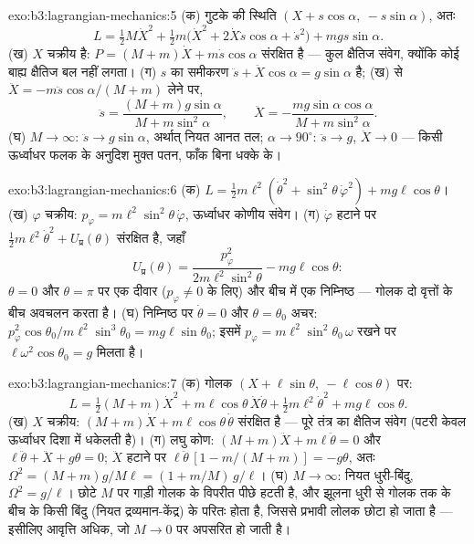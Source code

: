 \begin{solution}{exo:b3:lagrangian-mechanics:5}
(क) गुटके की स्थिति $(X + s\cos\alpha,\ -s\sin\alpha)$, अतः
\[
L = \tfrac12 M\dot X^2 + \tfrac12 m\big(\dot X^2 +
2\dot X\dot s\cos\alpha + \dot s^2\big) + mgs\sin\alpha .
\]
(ख) $X$ चक्रीय है: $P = (M + m)\dot X + m\dot s\cos\alpha$ संरक्षित है
--- कुल क्षैतिज संवेग, क्योंकि कोई बाह्य क्षैतिज बल नहीं लगता।
(ग) $s$ का समीकरण $\ddot s + \ddot
X\cos\alpha = g\sin\alpha$ है; (ख) से $\ddot X = -m\ddot s\cos\alpha/(M +
m)$ लेने पर,
\[
\ddot s = \frac{(M + m)g\sin\alpha}{M + m\sin^2\alpha} , \qquad
\ddot X = -\frac{mg\sin\alpha\cos\alpha}{M + m\sin^2\alpha} .
\]
(घ) $M \to \infty$: $\ddot s \to g\sin\alpha$, अर्थात् नियत आनत तल;
$\alpha \to 90^\circ$: $\ddot s \to g$, $\ddot X \to 0$ --- किसी
ऊर्ध्वाधर फलक के अनुदिश मुक्त पतन, फाँक बिना धक्के के।
\end{solution}

\begin{solution}{exo:b3:lagrangian-mechanics:6}
(क) $L = \tfrac12 m\ell^2(\dot\theta^2 + \sin^2\theta\,\dot\varphi^2) +
mg\ell\cos\theta$। (ख) $\varphi$ चक्रीय: $p_\varphi =
m\ell^2\sin^2\theta\,\dot\varphi$, ऊर्ध्वाधर कोणीय संवेग। (ग)
$\dot\varphi$ हटाने पर $\tfrac12 m\ell^2\dot\theta^2 +
U_{\text{प्र}}(\theta)$ संरक्षित है, जहाँ
\[
U_{\text{प्र}}(\theta) = \frac{p_\varphi^2}{2m\ell^2\sin^2\theta}
 - mg\ell\cos\theta :
\]
$\theta = 0$ और $\theta = \pi$ पर एक दीवार ($p_\varphi \neq 0$ के लिए)
और बीच में एक निम्निष्ठ --- गोलक दो वृत्तों के बीच अवचलन करता है। (घ)
निम्निष्ठ पर $\dot\theta = 0$ और $\theta = \theta_0$ अचर:
$p_\varphi^2\cos\theta_0/m\ell^2\sin^3\theta_0 = mg\ell\sin\theta_0$;
इसमें $p_\varphi = m\ell^2\sin^2\theta_0\,\omega$ रखने पर
$\ell\omega^2\cos\theta_0 = g$ मिलता है।
\end{solution}

\begin{solution}{exo:b3:lagrangian-mechanics:7}
(क) गोलक $(X + \ell\sin\theta,\ -\ell\cos\theta)$ पर:
\[
L = \tfrac12(M + m)\dot X^2 + m\ell\cos\theta\,\dot X\dot\theta
 + \tfrac12 m\ell^2\dot\theta^2 + mg\ell\cos\theta .
\]
(ख) $X$ चक्रीय: $(M + m)\dot X + m\ell\cos\theta\,\dot\theta$
संरक्षित है --- पूरे तंत्र का क्षैतिज संवेग (पटरी केवल ऊर्ध्वाधर
दिशा में धकेलती है)। (ग) लघु कोण: $(M + m)\ddot X +
m\ell\ddot\theta = 0$ और $\ell\ddot\theta + \ddot X + g\theta = 0$;
$\ddot X$ हटाने पर $\ell\ddot\theta\,[1 - m/(M + m)] = -g\theta$,
अतः $\Omega^2 = (M + m)g/M\ell = (1 + m/M)\,g/\ell$। (घ) $M \to \infty$:
नियत धुरी-बिंदु, $\Omega^2 = g/\ell$। छोटे $M$ पर गाड़ी गोलक के विपरीत
पीछे हटती है, और झूलना धुरी से गोलक तक के बीच के किसी बिंदु (नियत
द्रव्यमान-केंद्र) के परितः होता है, जिससे प्रभावी लोलक छोटा हो जाता है
--- इसीलिए आवृत्ति अधिक, जो $M \to 0$ पर अपसरित हो जाती है।
\end{solution}

